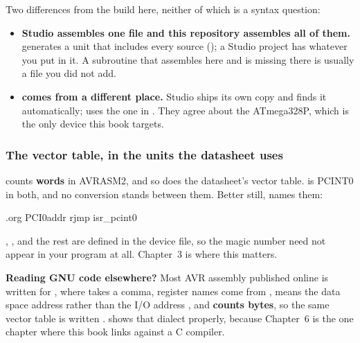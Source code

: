 Two differences from the build here, neither of which is a syntax question:
\begin{itemize}
  \item \textbf{Studio assembles one file and this repository assembles all of them.}
     generates a unit that includes every source (); a Studio
    project has whatever you put in it. A subroutine that assembles here and is missing there is
    usually a file you did not add.
  \item \textbf{ comes from a different place.} Studio ships its own copy and
    finds it automatically;  uses the one in . They agree about
    the ATmega328P, which is the only device this book targets.
\end{itemize}

\subsubsection{The vector table, in the units the datasheet uses}
 counts \textbf{words} in AVRASM2, and so does the datasheet's vector table.
 is PCINT0 in both, and no conversion stands between them. Better still,
 names them:

\begin{asm}
.org PCI0addr
    rjmp isr_pcint0
\end{asm}

, ,  and the rest are defined in the device file, so
the magic number need not appear in your program at all. Chapter~3 is where this matters.

\begin{aside}
\textbf{Reading GNU  code elsewhere?} Most AVR assembly published online is written for
, where  takes a comma, register names come from ,
 means the data space address  rather than the I/O address ,
and \textbf{ counts bytes}, so the same vector table is written .
 shows that dialect properly, because Chapter~6 is the one chapter where this book links
against a C compiler.
\end{aside}
